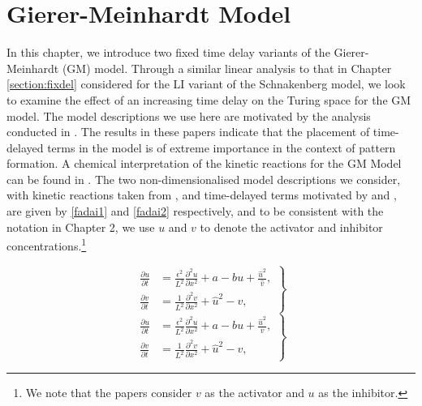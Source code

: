 \chapter{Gierer-Meinhardt Model}

In this chapter, we introduce two fixed time delay variants of the Gierer-Meinhardt (GM) model. Through a similar linear analysis to that in Chapter \ref{section:fixdel} considered for the LI variant of the Schnakenberg model, we look to examine the effect of an increasing time delay on the Turing space for the GM model. The model descriptions we use here are motivated by the analysis conducted in \cite{fadai1,fadai2}. The results in these papers indicate that the placement of time-delayed terms in the model is of extreme importance in the context of pattern formation. A chemical interpretation of the kinetic reactions for the GM Model can be found in \cite{leegaffmonk}. The two non-dimensionalised model descriptions we consider, with kinetic reactions taken from \cite{murray}, and time-delayed terms motivated by \cite{fadai1} and \cite{fadai2}, are given by \eqref{fadai1} and \eqref{fadai2} respectively, and to be consistent with the notation in Chapter 2, we use $u$ and $v$ to denote the activator and inhibitor concentrations.\footnote{We note that the papers \cite{fadai1,fadai2} consider $v$ as the activator and $u$ as the inhibitor.}
\begin{multicols}{2}
\begin{equation}\label{fadai1}
  \left.\begin{split}
\frac{\partial u}{\partial t}&=\frac{\epsilon^2}{L^2}\frac{\partial^2 u}{\partial x^2}+a-bu+\frac{\hat{u}^2}{\hat{v}},\\
\frac{\partial v}{\partial t}&=\frac{1}{L^2}\frac{\partial^2 v}{\partial x^2}+\hat{u}^2-v,
\end{split}\right\}
\end{equation}
\break
\begin{equation}\label{fadai2}
  \left.\begin{split}
\frac{\partial u}{\partial t}&=\frac{\epsilon^2}{L^2}\frac{\partial^2 u}{\partial x^2}+a-bu+\frac{\hat{u}^2}{v},\\
\frac{\partial v}{\partial t}&=\frac{1}{L^2}\frac{\partial^2 v}{\partial x^2}+\hat{u}^2-v,
\end{split}\right\}
\end{equation}
\end{multicols}
